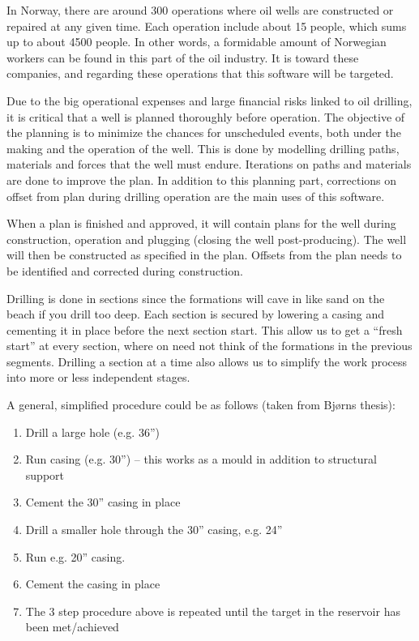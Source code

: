 \documentclass{report}
\begin{document}
In Norway, there are around 300 operations where oil wells are constructed or repaired at any given time. Each operation include about 15 people, which sums up to about 4500 people. In other words, a formidable amount of Norwegian workers can be found in this part of the oil industry. It is toward these companies, and regarding these operations that this software will be targeted.

Due to the big operational expenses and large financial risks linked to oil drilling, it is critical that a well is planned thoroughly before operation. The objective of the planning is to minimize the chances for unscheduled events, both under the making and the operation of the well. This is done by modelling drilling paths, materials and forces that the well must endure. Iterations on paths and materials are done to improve the plan. In addition to this planning part, corrections on offset from plan during drilling operation are the main uses of this software.

When a plan is finished and approved, it will contain plans for the well during construction, operation and plugging (closing the well post-producing). The well will then be constructed as specified in the plan. Offsets from the plan needs to be identified and corrected during construction.

Drilling is done in sections since the formations will cave in like sand on the beach if you drill too deep. Each section is secured by lowering a casing and cementing it in place before the next section start. This allow us to get a “fresh start” at every section, where on need not think of the formations in the previous segments. Drilling a section at a time also allows us to simplify the work process into more or less independent stages.


A general, simplified procedure could be as follows (taken from Bjørns thesis):

\begin{enumerate}
    \item Drill a large hole (e.g. 36”)
    \item Run casing (e.g. 30”) – this works as a mould in addition to structural support
    \item Cement the 30” casing in place
    \item Drill a smaller hole through the 30” casing, e.g. 24”
    \item Run e.g. 20” casing.
    \item Cement the casing in place
    \item The 3 step procedure above is repeated until the target in the reservoir has been met/achieved
\end{enumerate}
\end{document}
